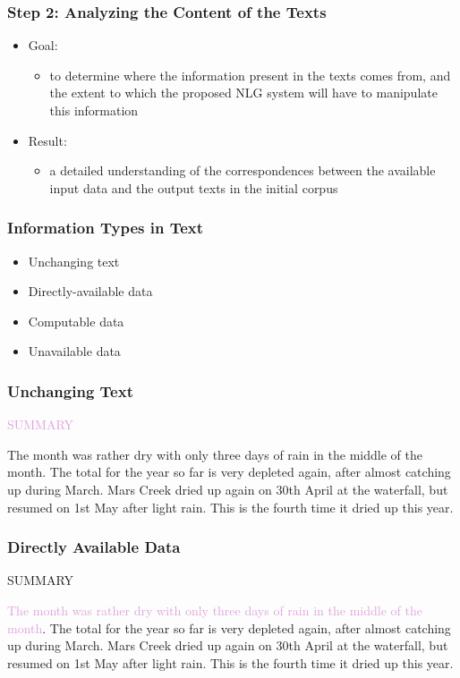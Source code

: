\documentclass[compress,color=usenames]{beamer}
\newcommand{\mH}[1]{\textcolor{Plum}{#1}}
\begin{document}
\begin{frame}
\frametitle{Step 2: Analyzing the Content of the Texts}

\label{f86}
\begin{itemize}
\item { {Goal: }}
\begin{itemize}
\item to determine where the information present in the texts comes from, and the extent to which the proposed NLG system will have to manipulate this information
\end{itemize}
\item { {Result: }}
\begin{itemize}
\item a detailed understanding of the correspondences between the available input data and the output texts in the initial corpus
\end{itemize}
\end{itemize}


\end{frame}

\begin{frame}
\frametitle{Information Types in Text}

\label{f88}
\begin{itemize}
\item { {Unchanging text}}
\item { {Directly-available data}}
\item { {Computable data}}
\item { {Unavailable data}}
\end{itemize}

\end{frame}

\begin{frame}
\frametitle{Unchanging Text}

\mH{SUMMARY}

{ {The month was rather dry with only three days of rain in the middle of the month. The total for the year so far is very depleted again, after almost catching up during March. Mars Creek dried up again on 30th April at the waterfall, but resumed on 1st May after light rain. This is the fourth time it dried up this year.}}

\end{frame}

\begin{frame}
\frametitle{Directly Available Data}

SUMMARY

\mH{The month was rather dry with only three days of rain in the middle of the month}. The total for the year so far is very depleted again, after almost catching up during March. Mars Creek dried up again on 30th April at the waterfall, but resumed on 1st May after light rain. This is the fourth time it dried up this year.

\end{frame}
\end{document}
